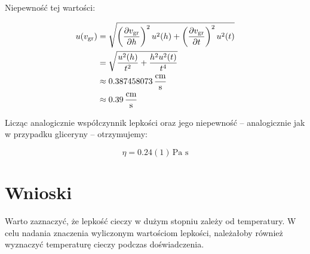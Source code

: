 \documentclass[a4paper]{article}
\newlength{\du}
\begin{document}
Niepewność tej wartości:

\begin{align*}
	u(v_{\text{gr}}) &= \sqrt{\left(\frac{\partial v_{\text{gr}}}{\partial h}\right)^2 u^2(h) + \left(\frac{\partial v_{\text{gr}}}{\partial t}\right)^2 u^2(t)} \\
	&= \sqrt{\frac{u^2(h)}{t^2} + \frac{h^2 u^2(t)}{t^4}} \\
	&\approx 0.387458073 \, \frac{\text{cm}}{\text{s}} \\
	&\approx 0.39 \, \frac{\text{cm}}{\text{s}}
\end{align*}

Licząc analogicznie współczynnik lepkości oraz jego niepewność -- analogicznie jak w przypadku gliceryny -- otrzymujemy:

$$
\eta = 0.24 (1) \, \text{Pa s}
$$

\section{Wnioski}

Warto zaznaczyć, że lepkość cieczy w dużym stopniu zależy od temperatury.
W celu nadania znaczenia wyliczonym wartościom lepkości, należałoby również wyznaczyć temperaturę cieczy podczas doświadczenia.
\end{document}
